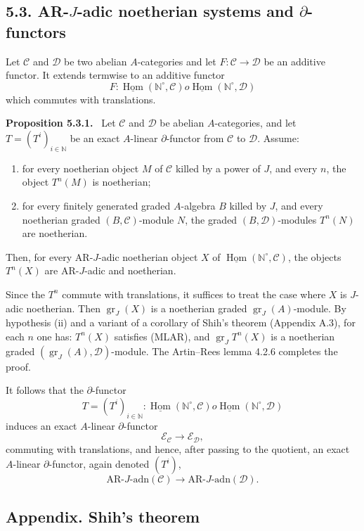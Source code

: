 \documentclass[12pt]{article}
\newcommand{\bN}{\mathbb N}
\newcommand{\cC}{\mathcal C}
\newcommand{\cD}{\mathcal D}
\newcommand{\cE}{\mathcal E}
\newcommand{\Hom}{\operatorname{Hom}}
\newcommand{\gr}{\operatorname{gr}}
\newcommand{\adn}{\mathrm{adn}}
\newcommand{\AR}{\mathrm{AR}}
\newenvironment{statement}[1]{\par\medskip\noindent\textbf{#1.}\ }{\par\medskip}
\begin{document}
\subsection*{5.3. AR-$J$-adic noetherian systems and $\partial$-functors}

Let $\cC$ and $\cD$ be two abelian $A$-categories and let
$F:\cC\to\cD$ be an additive functor. It extends termwise to an additive functor
\[
       F:\underline{\Hom}(\bN^\circ,\cC)	o
       \underline{\Hom}(\bN^\circ,\cD)
\]
which commutes with translations.

\begin{statement}{Proposition 5.3.1}
Let $\cC$ and $\cD$ be abelian $A$-categories, and let
$T=(T^i)_{i\in\bN}$ be an exact $A$-linear $\partial$-functor from $\cC$ to $\cD$.
Assume:
\begin{enumerate}[label=(\roman*)]
\item for every noetherian object $M$ of $\cC$ killed by a power of $J$, and every
$n$, the object $T^n(M)$ is noetherian;
\item for every finitely generated graded $A$-algebra $B$ killed by $J$, and every
noetherian graded $(B,\cC)$-module $N$, the graded $(B,\cD)$-modules $T^n(N)$ are
noetherian.
\end{enumerate}
Then, for every AR-$J$-adic noetherian object $X$ of
$\underline{\Hom}(\bN^\circ,\cC)$, the objects $T^n(X)$ are AR-$J$-adic and
noetherian.
\end{statement}

Since the $T^n$ commute with translations, it suffices to treat the case where $X$
is $J$-adic noetherian. Then $\gr_J(X)$ is a noetherian graded
$\gr_J(A)$-module. By hypothesis (ii) and a variant of a corollary of Shih's theorem
(Appendix A.3), for each $n$ one has: $T^n(X)$ satisfies (MLAR), and
$\gr_J T^n(X)$ is a noetherian graded $(\gr_J(A),\cD)$-module. The Artin--Rees
lemma 4.2.6 completes the proof.

It follows that the $\partial$-functor
\[
        T=(T^i)_{i\in\bN}:
        \underline{\Hom}(\bN^\circ,\cC)	o
        \underline{\Hom}(\bN^\circ,\cD)
\]
induces an exact $A$-linear $\partial$-functor
\[
        \cE_\cC\longrightarrow\cE_\cD,
\]
commuting with translations, and hence, after passing to the quotient, an exact
$A$-linear $\partial$-functor, again denoted $(T^i)$,
\[
        \AR\text{-}J\text{-}\adn(\cC)\longrightarrow
        \AR\text{-}J\text{-}\adn(\cD).
\]

\subsection*{Appendix. Shih's theorem}
\end{document}
